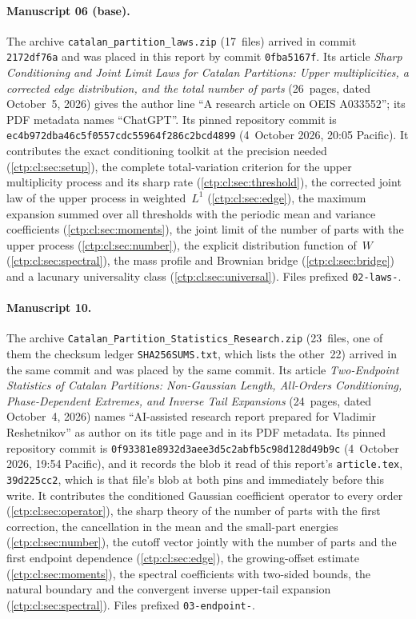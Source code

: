 \documentclass[11pt,a4paper]{article}
\numberwithin{equation}{section}
\theoremstyle{definition}
\theoremstyle{remark}
\begin{document}
\paragraph{Manuscript 06 (base).} The archive
\nolinkurl{catalan_partition_laws.zip} (17~files) arrived in commit
\texttt{2172df76a} and was placed in this report by commit
\texttt{0fba5167f}. Its article \emph{Sharp Conditioning and Joint Limit
Laws for Catalan Partitions: Upper multiplicities, a corrected edge
distribution, and the total number of parts} (26~pages, dated October~5,
2026) gives the author line ``A research article on OEIS A033552''; its PDF
metadata names ``ChatGPT''. Its pinned repository commit is
\texttt{ec4b972dba46c5f0557cdc55964f286c2bcd4899} (4~October 2026, 20:05
Pacific). It contributes the exact conditioning toolkit at the precision
needed (\cref{ctp:cl:sec:setup}), the complete total-variation criterion for
the upper multiplicity process and its sharp rate
(\cref{ctp:cl:sec:threshold}), the corrected joint law of the upper process
in weighted~$L^1$ (\cref{ctp:cl:sec:edge}), the maximum expansion summed
over all thresholds with the periodic mean and variance coefficients
(\cref{ctp:cl:sec:moments}), the joint limit of the number of parts with
the upper process (\cref{ctp:cl:sec:number}), the explicit distribution
function of~$W$ (\cref{ctp:cl:sec:spectral}), the mass profile and
Brownian bridge (\cref{ctp:cl:sec:bridge}) and a lacunary universality
class (\cref{ctp:cl:sec:universal}). Files prefixed \texttt{02-laws-}.

\paragraph{Manuscript 10.} The archive
\nolinkurl{Catalan_Partition_Statistics_Research.zip} (23~files, one of
them the checksum ledger \texttt{SHA256SUMS.txt}, which lists the other~22)
arrived in the same commit and was placed by the same commit. Its article
\emph{Two-Endpoint Statistics of Catalan Partitions: Non-Gaussian Length,
All-Orders Conditioning, Phase-Dependent Extremes, and Inverse Tail
Expansions} (24~pages, dated October~4, 2026) names ``AI-assisted research
report prepared for Vladimir Reshetnikov'' as author on its title page and
in its PDF metadata. Its pinned repository commit is
\texttt{0f93381e8932d3aee3d5c2abfb5c98d128d49b9c} (4~October 2026, 19:54
Pacific), and it records the blob it read of this report's
\texttt{article.tex}, \texttt{39d225cc2}, which is that file's blob at both
pins and immediately before this write. It contributes the conditioned
Gaussian coefficient operator to every order (\cref{ctp:cl:sec:operator}),
the sharp theory of the number of parts with the first correction, the
cancellation in the mean and the small-part energies
(\cref{ctp:cl:sec:number}), the cutoff vector jointly with the number of
parts and the first endpoint dependence (\cref{ctp:cl:sec:edge}), the
growing-offset estimate (\cref{ctp:cl:sec:moments}), the spectral
coefficients with two-sided bounds, the natural boundary and the convergent
inverse upper-tail expansion (\cref{ctp:cl:sec:spectral}). Files prefixed
\texttt{03-endpoint-}.
\end{document}
